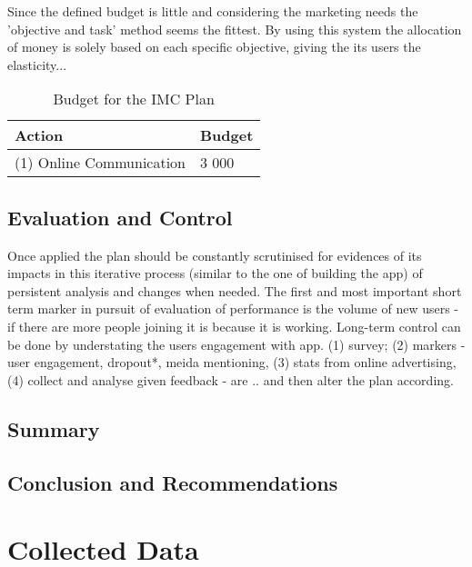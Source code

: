 \documentclass[12pt]{article}
\begin{document}
Since the defined budget is little and considering the marketing needs the 'objective and task' method seems the fittest. By using this system the allocation of money is solely based on each specific objective, giving the its users the elasticity...

\begin{table}[htb]
\small
\caption{Budget for the IMC Plan}
\label{table:budget}
\centering
\begin{tabular}{ @{}P{0.5\textwidth}P{0.2\textwidth}@{} }
Action	&	Budget	\\ \hline
 (1) Online Communication	&	3 000  \\
\end{tabular}
\end{table}


\subsection{Evaluation and Control}

Once applied the plan should be constantly scrutinised for evidences of its impacts in this iterative process (similar to the one of building the app) of persistent analysis and changes when needed. The first and most important short term marker in pursuit of evaluation of performance is the volume of new users - if there are more people joining it is because it is working. Long-term control can be done by understating the users engagement with app. (1) survey; (2) markers - user engagement, dropout*, meida mentioning,  (3) stats from online advertising, (4) collect and analyse given feedback - are .. and then alter the plan according.


\subsection{Summary}


\subsection{Conclusion and Recommendations}




\cleardoublepage
\newpage	

\printbibliography
\cleardoublepage

\appendix

\section{Collected Data}\label{data}
\end{document}
